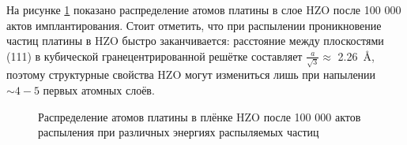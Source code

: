 На рисунке \cref{fig:pt_distr} показано распределение атомов платины в слое HZO после 100 000 актов имплантирования. Стоит отметить, что при распылении проникновение частиц платины в HZO быстро заканчивается: расстояние между плоскостями (111) в кубической гранецентрированной решётке составляет \(\frac{a}{\sqrt{3}}\approx\) \SI{2.26}{\angstrom}, поэтому структурные свойства HZO могут измениться лишь при напылении \(\sim 4-5\) первых атомных слоёв.

\begin{figure}[ht]
    \caption[Этот текст попадает в названия рисунков в списке рисунков]{Распределение атомов платины в плёнке HZO после 100 000 актов распыления при различных энергиях распыляемых частиц}\label{fig:pt_distr}
\end{figure}





